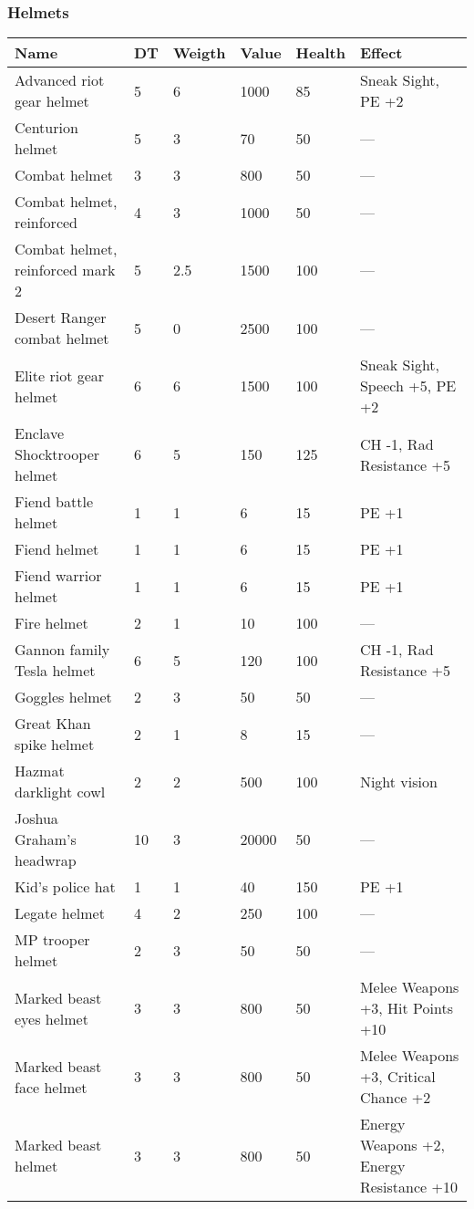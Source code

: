 
\subsubsection{Helmets}
\begin{longtable}{|p{4cm}|p{1.2cm}|p{1.2cm}|p{1.2cm}|p{1.2cm}|p{4cm}|}
\hline
\bfseries Name & \bfseries DT & \bfseries Weigth & \bfseries Value & \bfseries Health & \bfseries Effect \\
\hline
\endhead
Advanced riot gear helmet & 5 & 6 & 1000 & 85 & Sneak Sight, PE +2 \\
Centurion helmet & 5 & 3 & 70 & 50 & — \\
Combat helmet & 3 & 3 & 800 & 50 & — \\
Combat helmet, reinforced & 4 & 3 & 1000 & 50 & — \\
Combat helmet, reinforced mark 2 & 5 & 2.5 & 1500 & 100 & — \\
Desert Ranger combat helmet & 5 & 0 & 2500 & 100 & — \\
Elite riot gear helmet & 6 & 6 & 1500 & 100 & Sneak Sight, Speech +5, PE +2 \\
Enclave Shocktrooper helmet & 6 & 5 & 150 & 125 & CH -1, Rad Resistance +5 \\
Fiend battle helmet & 1 & 1 & 6 & 15 & PE +1 \\
Fiend helmet & 1 & 1 & 6 & 15 & PE +1 \\
Fiend warrior helmet & 1 & 1 & 6 & 15 & PE +1 \\
Fire helmet & 2 & 1 & 10 & 100 & — \\
Gannon family Tesla helmet & 6 & 5 & 120 & 100 & CH -1, Rad Resistance +5 \\
Goggles helmet & 2 & 3 & 50 & 50 & — \\
Great Khan spike helmet & 2 & 1 & 8 & 15 & — \\
Hazmat darklight cowl & 2 & 2 & 500 & 100 & Night vision \\
Joshua Graham's headwrap & 10 & 3 & 20000 & 50 & — \\
Kid's police hat & 1 & 1 & 40 & 150 & PE +1 \\
Legate helmet & 4 & 2 & 250 & 100 & — \\
MP trooper helmet & 2 & 3 & 50 & 50 & — \\
Marked beast eyes helmet & 3 & 3 & 800 & 50 & Melee Weapons +3, Hit Points +10 \\
Marked beast face helmet & 3 & 3 & 800 & 50 & Melee Weapons +3, Critical Chance +2 \\
Marked beast helmet & 3 & 3 & 800 & 50 & Energy Weapons +2, Energy Resistance +10 \\

\end{longtable}
